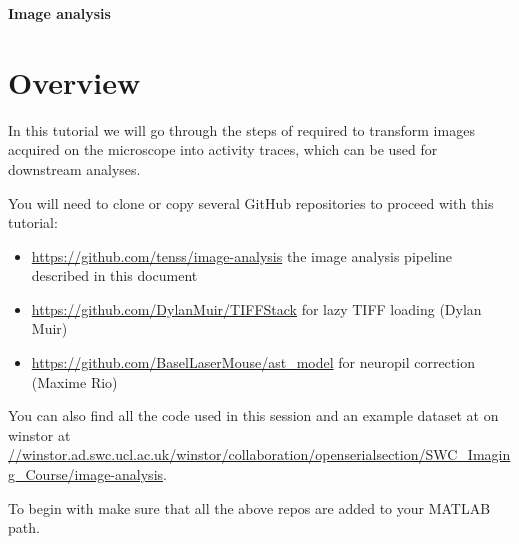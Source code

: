 \documentclass[a4paper]{report}
\begin{document}
\addtocounter{exercises}{1}

\begin{center}
\textbf{\Large{Image analysis}}
\end{center}	
\section{Overview}
In this tutorial we will go through the steps of required to transform images acquired on the microscope into activity traces, which can be used for downstream analyses.

You will need to clone or copy several GitHub repositories to proceed with this tutorial:
\begin{itemize}
	\item \href{https://github.com/tenss/image-analysis}{https://github.com/tenss/image-analysis} the image analysis pipeline described in this document 
	\item \href{https://github.com/DylanMuir/TIFFStack}{https://github.com/DylanMuir/TIFFStack} for lazy TIFF loading (Dylan Muir)
	\item \href{https://github.com/BaselLaserMouse/ast\_model}{https://github.com/BaselLaserMouse/ast\_model} for neuropil correction (Maxime Rio)
\end{itemize} 

You can also find all the code used in this session and an example dataset at on winstor at \href{smb://winstor.ad.swc.ucl.ac.uk/winstor/collaboration/openserialsection/SWC\_Imaging\_Course/image-analysis}{//winstor.ad.swc.ucl.ac.uk/winstor/collaboration/openserialsection/SWC\_Imaging\_Course/image-analysis}. 

To begin with make sure that all the above repos are added to your MATLAB path.
\end{document}
